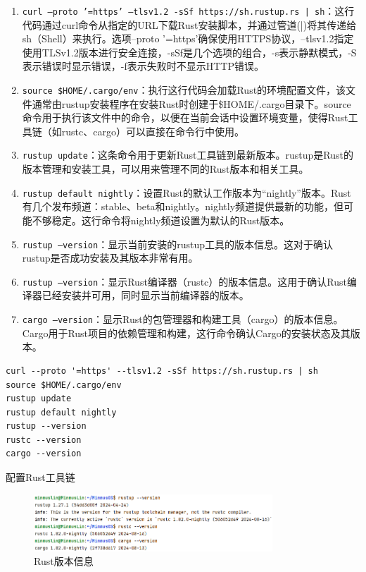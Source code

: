 \begin{enumerate}
\begin{enumerate}
              \item \texttt{curl --proto '=https' --tlsv1.2 -sSf https://sh.rustup.rs | sh}：这行代码通过curl命令从指定的URL下载Rust安装脚本，并通过管道(|)将其传递给sh（Shell）来执行。选项--proto '=https'确保使用HTTPS协议，--tlsv1.2指定使用TLSv1.2版本进行安全连接，-sSf是几个选项的组合，-s表示静默模式，-S表示错误时显示错误，-f表示失败时不显示HTTP错误。
              \item \texttt{source \$HOME/.cargo/env}：执行这行代码会加载Rust的环境配置文件，该文件通常由rustup安装程序在安装Rust时创建于\$HOME/.cargo目录下。source命令用于执行该文件中的命令，以便在当前会话中设置环境变量，使得Rust工具链（如rustc、cargo）可以直接在命令行中使用。
              \item \texttt{rustup update}：这条命令用于更新Rust工具链到最新版本。rustup是Rust的版本管理和安装工具，可以用来管理不同的Rust版本和相关工具。
              \item \texttt{rustup default nightly}：设置Rust的默认工作版本为“nightly”版本。Rust有几个发布频道：stable、beta和nightly。nightly频道提供最新的功能，但可能不够稳定。这行命令将nightly频道设置为默认的Rust版本。
              \item \texttt{rustup --version}：显示当前安装的rustup工具的版本信息。这对于确认rustup是否成功安装及其版本非常有用。
              \item \texttt{rustup --version}：显示Rust编译器（rustc）的版本信息。这用于确认Rust编译器已经安装并可用，同时显示当前编译器的版本。
              \item \texttt{cargo --version}：显示Rust的包管理器和构建工具（cargo）的版本信息。Cargo用于Rust项目的依赖管理和构建，这行命令确认Cargo的安装状态及其版本。
          \end{enumerate}
          \begin{listing}[htbp]
              \begin{verbatim}
curl --proto '=https' --tlsv1.2 -sSf https://sh.rustup.rs | sh
source $HOME/.cargo/env
rustup update
rustup default nightly
rustup --version
rustc --version
cargo --version
              \end{verbatim}
              \caption{配置Rust工具链}\label{lst:ConfigureRust}
          \end{listing}
          \begin{figure}[htbp]
              \centering
              \includegraphics[width=0.8\textwidth]{figures/RustVersion.png}
              \caption{Rust版本信息}
              \label{fig:RustVersion}
          \end{figure}
\end{enumerate}

